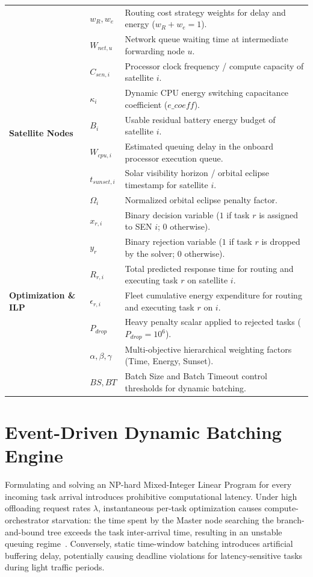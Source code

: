 \begin{table}[htbp]
\begin{tabular}{@{}llp{9.2cm}@{}}
& $w_R, w_e$ & Routing cost strategy weights for delay and energy ($w_R + w_e = 1$). \\
& $W_{net,u}$ & Network queue waiting time at intermediate forwarding node $u$. \\
\midrule
\multirow{6}{*}{\textbf{Satellite Nodes}}
& $C_{sen,i}$ & Processor clock frequency / compute capacity of satellite $i$. \\
& $\kappa_i$ & Dynamic CPU energy switching capacitance coefficient ($e\_coeff$). \\
& $B_i$ & Usable residual battery energy budget of satellite $i$. \\
& $W_{cpu,i}$ & Estimated queuing delay in the onboard processor execution queue. \\
& $t_{sunset,i}$ & Solar visibility horizon / orbital eclipse timestamp for satellite $i$. \\
& $\Omega_i$ & Normalized orbital eclipse penalty factor. \\
\midrule
\multirow{7}{*}{\textbf{Optimization \& ILP}}
& $x_{r,i}$ & Binary decision variable ($1$ if task $r$ is assigned to SEN $i$; $0$ otherwise). \\
& $y_r$ & Binary rejection variable ($1$ if task $r$ is dropped by the solver; $0$ otherwise). \\
& $R_{r,i}$ & Total predicted response time for routing and executing task $r$ on satellite $i$. \\
& $\epsilon_{r,i}$ & Fleet cumulative energy expenditure for routing and executing task $r$ on $i$. \\
& $P_{drop}$ & Heavy penalty scalar applied to rejected tasks ($P_{drop} = 10^6$). \\
& $\alpha, \beta, \gamma$ & Multi-objective hierarchical weighting factors (Time, Energy, Sunset). \\
& $BS, BT$ & Batch Size and Batch Timeout control thresholds for dynamic batching. \\
\bottomrule
\end{tabular}
\end{table}

\section{Event-Driven Dynamic Batching Engine}
\label{sec:dynamic_batching}

Formulating and solving an NP-hard Mixed-Integer Linear Program for every incoming task arrival introduces prohibitive computational latency. 
Under high offloading request rates $\lambda$, instantaneous per-task optimization causes compute-orchestrator starvation: the time spent by the Master node searching the branch-and-bound tree exceeds the task inter-arrival time, resulting in an unstable queuing regime~\cite{wolsey1998integer, icdcs_satellite_2025}. 
Conversely, static time-window batching introduces artificial buffering delay, potentially causing deadline violations for latency-sensitive tasks during light traffic periods.

